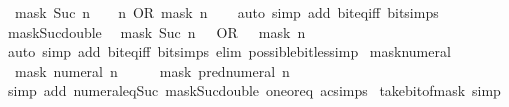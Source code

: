 \begin{isabellebody}
\ \ {\isacartoucheopen}mask\ {\isacharparenleft}{\kern0pt}Suc\ n{\isacharparenright}{\kern0pt}\ {\isacharequal}{\kern0pt}\ {}\ {\isacharcircum}{\kern0pt}\ n\ OR\ mask\ n{\isacartoucheclose}\isanewline
%
\isadelimproof
\ \ %
\endisadelimproof
%
\isatagproof
{}\isamarkupfalse%
\ {\isacharparenleft}{\kern0pt}auto\ simp\ add{\isacharcolon}{\kern0pt}\ bit{\isacharunderscore}{\kern0pt}eq{\isacharunderscore}{\kern0pt}iff\ bit{\isacharunderscore}{\kern0pt}simps{\isacharparenright}{\kern0pt}%
\endisatagproof
{\isafoldproof}%
%
\isadelimproof
\isanewline
%
\endisadelimproof
\isanewline
{}\isamarkupfalse%
\ mask{\isacharunderscore}{\kern0pt}Suc{\isacharunderscore}{\kern0pt}double{\isacharcolon}{\kern0pt}\isanewline
\ \ {\isacartoucheopen}mask\ {\isacharparenleft}{\kern0pt}Suc\ n{\isacharparenright}{\kern0pt}\ {\isacharequal}{\kern0pt}\ {}\ OR\ {}\ {\isacharasterisk}{\kern0pt}\ mask\ n{\isacartoucheclose}\isanewline
%
\isadelimproof
\ \ %
\endisadelimproof
%
\isatagproof
{}\isamarkupfalse%
\ {\isacharparenleft}{\kern0pt}auto\ simp\ add{\isacharcolon}{\kern0pt}\ bit{\isacharunderscore}{\kern0pt}eq{\isacharunderscore}{\kern0pt}iff\ bit{\isacharunderscore}{\kern0pt}simps\ elim{\isacharcolon}{\kern0pt}\ possible{\isacharunderscore}{\kern0pt}bit{\isacharunderscore}{\kern0pt}less{\isacharunderscore}{\kern0pt}imp{\isacharparenright}{\kern0pt}%
\endisatagproof
{\isafoldproof}%
%
\isadelimproof
\isanewline
%
\endisadelimproof
\isanewline
{}\isamarkupfalse%
\ mask{\isacharunderscore}{\kern0pt}numeral{\isacharcolon}{\kern0pt}\isanewline
\ \ {\isacartoucheopen}mask\ {\isacharparenleft}{\kern0pt}numeral\ n{\isacharparenright}{\kern0pt}\ {\isacharequal}{\kern0pt}\ {}\ {\isacharplus}{\kern0pt}\ {}\ {\isacharasterisk}{\kern0pt}\ mask\ {\isacharparenleft}{\kern0pt}pred{\isacharunderscore}{\kern0pt}numeral\ n{\isacharparenright}{\kern0pt}{\isacartoucheclose}\isanewline
%
\isadelimproof
\ \ %
\endisadelimproof
%
\isatagproof
{}\isamarkupfalse%
\ {\isacharparenleft}{\kern0pt}simp\ add{\isacharcolon}{\kern0pt}\ numeral{\isacharunderscore}{\kern0pt}eq{\isacharunderscore}{\kern0pt}Suc\ mask{\isacharunderscore}{\kern0pt}Suc{\isacharunderscore}{\kern0pt}double\ one{\isacharunderscore}{\kern0pt}or{\isacharunderscore}{\kern0pt}eq\ ac{\isacharunderscore}{\kern0pt}simps{\isacharparenright}{\kern0pt}%
\endisatagproof
{\isafoldproof}%
%
\isadelimproof
\isanewline
%
\endisadelimproof
\isanewline
{}\isamarkupfalse%
\ take{\isacharunderscore}{\kern0pt}bit{\isacharunderscore}{\kern0pt}of{\isacharunderscore}{\kern0pt}mask\ {\isacharbrackleft}{\kern0pt}simp{\isacharbrackright}{\kern0pt}{\isacharcolon}{\kern0pt}\isanewline

\end{isabellebody}
